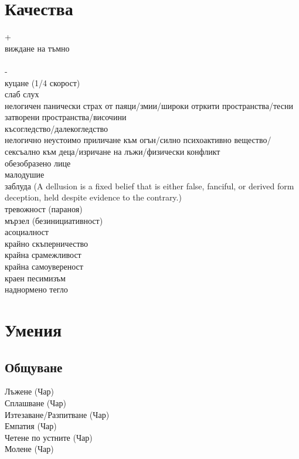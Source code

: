 \section{Качества}
+ \\
виждане на тъмно \\
\\
- \\
куцане (1/4 скорост)  \\
слаб слух  \\
нелогичен панически страх от паяци/змии/широки отркити пространства/тесни затворени пространства/височини                                     \\
късогледство/далекогледство                                                                                                                   \\
нелогично неустоимо приличане към огън/силно психоактивно вещество/сексъално към деца/изричане на лъжи/физически конфликт                     \\
обезобразено лице                                                                                                                             \\
малодушие                                                                                                                                     \\
заблуда (A dellusion is a fixed belief that is either false, fanciful, or derived form deception, held despite evidence to the contrary.)     \\
тревожност (параноя)                                                                                                                          \\
мързел (безинициативност)                                                                                                                     \\
асоциалност              \\
крайно скъперничество    \\
крайна срамежливост      \\
крайна самоувереност     \\
краен песимизъм          \\
наднормено тегло         \\

\section{Умения}
\subsection{Общуване}
Лъжене (Чар)                      \\
Сплашване (Чар)                   \\
Изтезаване/Разпитване (Чар)       \\
Емпатия (Чар)                     \\
Четене по устните (Чар)           \\
Молене (Чар)                      \\

